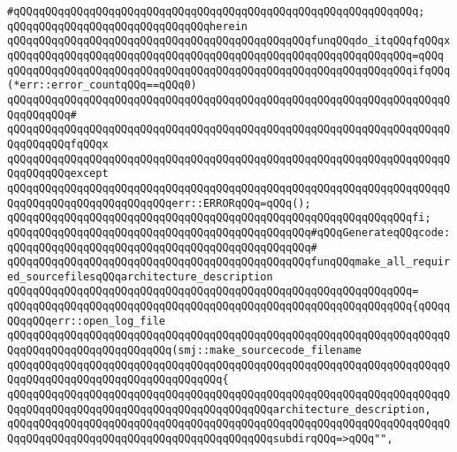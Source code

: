 \verb|#qQQqqQQqqQQqqQQqqQQqqQQqqQQqqQQqqQQqqQQqqQQqqQQqqQQqqQQqqQQqqQQq;|\newline
\verb|qQQqqQQqqQQqqQQqqQQqqQQqqQQqqQQqherein|\newline
\verb|qQQqqQQqqQQqqQQqqQQqqQQqqQQqqQQqqQQqqQQqqQQqqQQqfunqQQqdo_itqQQqfqQQqx|\newline
\verb|qQQqqQQqqQQqqQQqqQQqqQQqqQQqqQQqqQQqqQQqqQQqqQQqqQQqqQQqqQQqqQQq=qQQq|\newline
\verb|qQQqqQQqqQQqqQQqqQQqqQQqqQQqqQQqqQQqqQQqqQQqqQQqqQQqqQQqqQQqqQQqifqQQq(*err::error_countqQQq==qQQq0)|\newline
\verb|qQQqqQQqqQQqqQQqqQQqqQQqqQQqqQQqqQQqqQQqqQQqqQQqqQQqqQQqqQQqqQQqqQQqqQQqqQQqqQQq#|\newline
\verb|qQQqqQQqqQQqqQQqqQQqqQQqqQQqqQQqqQQqqQQqqQQqqQQqqQQqqQQqqQQqqQQqqQQqqQQqqQQqqQQqfqQQqx|\newline
\verb|qQQqqQQqqQQqqQQqqQQqqQQqqQQqqQQqqQQqqQQqqQQqqQQqqQQqqQQqqQQqqQQqqQQqqQQqqQQqqQQqexcept|\newline
\verb|qQQqqQQqqQQqqQQqqQQqqQQqqQQqqQQqqQQqqQQqqQQqqQQqqQQqqQQqqQQqqQQqqQQqqQQqqQQqqQQqqQQqqQQqqQQqqQQqerr::ERRORqQQq=qQQq();|\newline
\verb|qQQqqQQqqQQqqQQqqQQqqQQqqQQqqQQqqQQqqQQqqQQqqQQqqQQqqQQqqQQqqQQqfi;|\newline
\newline
\verb|qQQqqQQqqQQqqQQqqQQqqQQqqQQqqQQqqQQqqQQqqQQqqQQq#qQQqGenerateqQQqcode:|\newline
\verb|qQQqqQQqqQQqqQQqqQQqqQQqqQQqqQQqqQQqqQQqqQQqqQQq#|\newline
\verb|qQQqqQQqqQQqqQQqqQQqqQQqqQQqqQQqqQQqqQQqqQQqqQQqfunqQQqmake_all_required_sourcefilesqQQqarchitecture_description|\newline
\verb|qQQqqQQqqQQqqQQqqQQqqQQqqQQqqQQqqQQqqQQqqQQqqQQqqQQqqQQqqQQqqQQq=|\newline
\verb|qQQqqQQqqQQqqQQqqQQqqQQqqQQqqQQqqQQqqQQqqQQqqQQqqQQqqQQqqQQqqQQq{qQQqqQQqqQQqerr::open_log_file|\newline
\verb|qQQqqQQqqQQqqQQqqQQqqQQqqQQqqQQqqQQqqQQqqQQqqQQqqQQqqQQqqQQqqQQqqQQqqQQqqQQqqQQqqQQqqQQqqQQqqQQq(smj::make_sourcecode_filename|\newline
\verb|qQQqqQQqqQQqqQQqqQQqqQQqqQQqqQQqqQQqqQQqqQQqqQQqqQQqqQQqqQQqqQQqqQQqqQQqqQQqqQQqqQQqqQQqqQQqqQQqqQQqqQQq{|\newline
\verb|qQQqqQQqqQQqqQQqqQQqqQQqqQQqqQQqqQQqqQQqqQQqqQQqqQQqqQQqqQQqqQQqqQQqqQQqqQQqqQQqqQQqqQQqqQQqqQQqqQQqqQQqqQQqqQQqarchitecture_description,|\newline
\verb|qQQqqQQqqQQqqQQqqQQqqQQqqQQqqQQqqQQqqQQqqQQqqQQqqQQqqQQqqQQqqQQqqQQqqQQqqQQqqQQqqQQqqQQqqQQqqQQqqQQqqQQqqQQqqQQqsubdirqQQq=>qQQq"",|\newline
